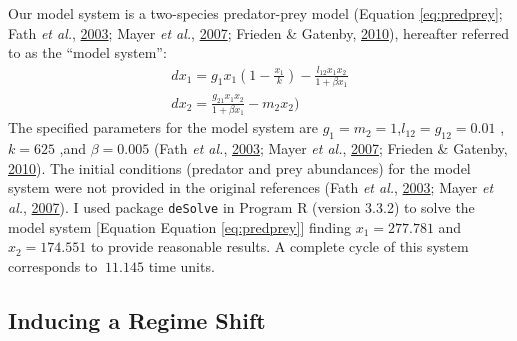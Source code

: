 \documentclass[print]{nuthesis}
\begin{document}
Our model system is a two-species predator-prey model (Equation \eqref{eq:predprey}; Fath \emph{et al.}, \protect\hyperlink{ref-fath_regime_2003}{2003}; Mayer \emph{et al.}, \protect\hyperlink{ref-mayer_applications_2007}{2007}; Frieden \& Gatenby, \protect\hyperlink{ref-frieden_exploratory_2010}{2010}), hereafter referred to as the ``model system'':
\begin{equation} 
\begin{array}{rcr}
  dx_1 = g_{1}x_{1}(1-\frac{x_1}{k})- \frac{l_{12} x_{1} x_{2}}{1+\beta x_{1}} \\
  dx_2 = \frac{g_{21}x_1 x_2}{1+\beta x_1} - m_2 x_2)
  \end{array}
  \label{eq:predprey}
\end{equation}
The specified parameters for the model system are \(g_1=m_2=1\),\(l_{12}=g_{12}= 0.01\) ,\(k=625\) ,and \(\beta=0.005\) (Fath \emph{et al.}, \protect\hyperlink{ref-fath_regime_2003}{2003}; Mayer \emph{et al.}, \protect\hyperlink{ref-mayer_applications_2007}{2007}; Frieden \& Gatenby, \protect\hyperlink{ref-frieden_exploratory_2010}{2010}). The initial conditions (predator and prey abundances) for the model system were not provided in the original references (Fath \emph{et al.}, \protect\hyperlink{ref-fath_regime_2003}{2003}; Mayer \emph{et al.}, \protect\hyperlink{ref-mayer_applications_2007}{2007}). I used package \texttt{deSolve} in Program R (version 3.3.2) to solve the model system {[}Equation Equation \eqref{eq:predprey}{]} finding \(x_1=277.781\) and \(x_2=174.551\) to provide reasonable results. A complete cycle of this system corresponds to \(~11.145\) time units.

\hypertarget{inducing-a-regime-shift}{%
\subsection{Inducing a Regime Shift}\label{inducing-a-regime-shift}}
\end{document}
